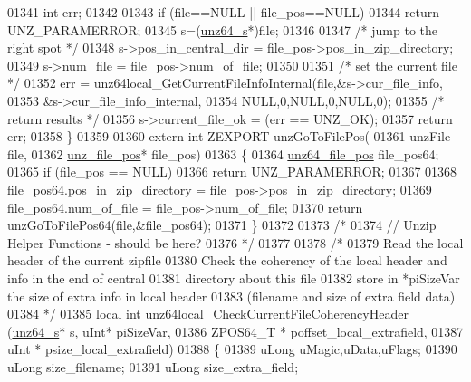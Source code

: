 \begin{DoxyCode}
01341     \textcolor{keywordtype}{int} err;
01342 
01343     \textcolor{keywordflow}{if} (file==NULL || file\_pos==NULL)
01344         \textcolor{keywordflow}{return} UNZ\_PARAMERROR;
01345     s=(\hyperlink{structunz64__s}{unz64\_s}*)file;
01346 
01347     \textcolor{comment}{/* jump to the right spot */}
01348     s->pos\_in\_central\_dir = file\_pos->pos\_in\_zip\_directory;
01349     s->num\_file           = file\_pos->num\_of\_file;
01350 
01351     \textcolor{comment}{/* set the current file */}
01352     err = unz64local\_GetCurrentFileInfoInternal(file,&s->cur\_file\_info,
01353                                                &s->cur\_file\_info\_internal,
01354                                                NULL,0,NULL,0,NULL,0);
01355     \textcolor{comment}{/* return results */}
01356     s->current\_file\_ok = (err == UNZ\_OK);
01357     \textcolor{keywordflow}{return} err;
01358 \}
01359 
01360 \textcolor{keyword}{extern} \textcolor{keywordtype}{int} ZEXPORT unzGoToFilePos(
01361     unzFile file,
01362     \hyperlink{structunz__file__pos__s}{unz\_file\_pos}* file\_pos)
01363 \{
01364     \hyperlink{structunz64__file__pos__s}{unz64\_file\_pos} file\_pos64;
01365     \textcolor{keywordflow}{if} (file\_pos == NULL)
01366         \textcolor{keywordflow}{return} UNZ\_PARAMERROR;
01367 
01368     file\_pos64.pos\_in\_zip\_directory = file\_pos->pos\_in\_zip\_directory;
01369     file\_pos64.num\_of\_file = file\_pos->num\_of\_file;
01370     \textcolor{keywordflow}{return} unzGoToFilePos64(file,&file\_pos64);
01371 \}
01372 
01373 \textcolor{comment}{/*}
01374 \textcolor{comment}{// Unzip Helper Functions - should be here?}
01376 \textcolor{comment}{*/}
01377 
01378 \textcolor{comment}{/*}
01379 \textcolor{comment}{  Read the local header of the current zipfile}
01380 \textcolor{comment}{  Check the coherency of the local header and info in the end of central}
01381 \textcolor{comment}{        directory about this file}
01382 \textcolor{comment}{  store in *piSizeVar the size of extra info in local header}
01383 \textcolor{comment}{        (filename and size of extra field data)}
01384 \textcolor{comment}{*/}
01385 local \textcolor{keywordtype}{int} unz64local\_CheckCurrentFileCoherencyHeader (\hyperlink{structunz64__s}{unz64\_s}* s, uInt* piSizeVar,
01386                                                     ZPOS64\_T * poffset\_local\_extrafield,
01387                                                     uInt  * psize\_local\_extrafield)
01388 \{
01389     uLong uMagic,uData,uFlags;
01390     uLong size\_filename;
01391     uLong size\_extra\_field;

\end{DoxyCode}
